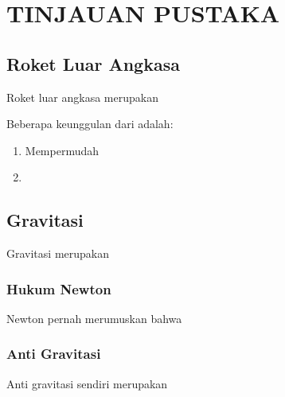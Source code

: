 \chapter{TINJAUAN PUSTAKA}
\vspace{4ex}

\setlength{\parindent}{7ex}

\section{Roket Luar Angkasa}
\vspace{1ex}

Roket luar angkasa merupakan \lipsum[1]
\vspace{0.5ex}

Beberapa keunggulan dari \lipsum[1][1-2] adalah:
\vspace{0.5ex}

\begin{enumerate}[nolistsep]

  \item Mempermudah \lipsum[1][1-2]
  \vspace{0.5ex}

  \item \lipsum[1][3-4]
  \vspace{0.5ex}

\end{enumerate}
\vspace{0.5ex}

\section{Gravitasi}
\vspace{1ex}

Gravitasi merupakan \lipsum[1]
\vspace{0.5ex}

\subsection{Hukum Newton}
\vspace{1ex}

Newton pernah merumuskan bahwa \lipsum[2]
\vspace{0.5ex}

\subsection{Anti Gravitasi}
\vspace{1ex}

Anti gravitasi sendiri merupakan \lipsum[3]
\vspace{0.5ex}